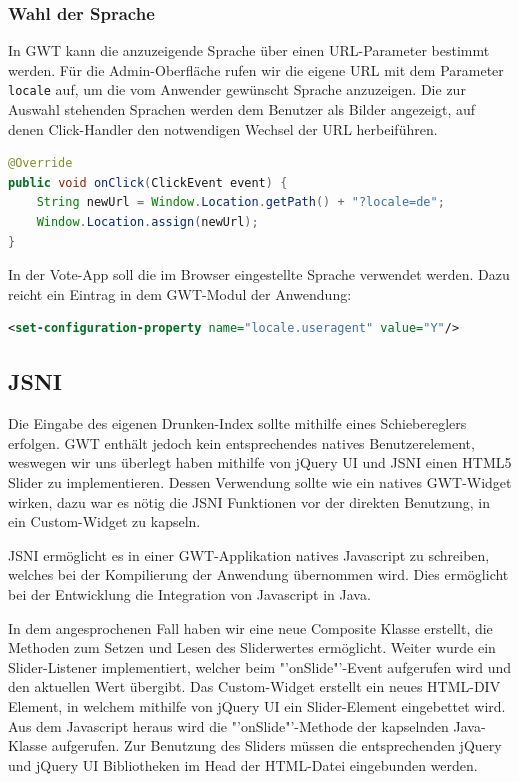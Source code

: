 \subsubsection{Wahl der Sprache}
In GWT kann die anzuzeigende Sprache über einen URL-Parameter bestimmt werden. Für die Admin-Oberfläche rufen wir die eigene URL
mit dem Parameter \texttt{locale} auf, um die vom Anwender
gewünscht Sprache anzuzeigen. Die zur Auswahl stehenden Sprachen werden dem Benutzer als Bilder angezeigt, auf denen Click-Handler den notwendigen Wechsel der URL herbeiführen.
\begin{lstlisting}[language=Java]
@Override
public void onClick(ClickEvent event) {
	String newUrl = Window.Location.getPath() + "?locale=de";
	Window.Location.assign(newUrl);
}
\end{lstlisting}
In der Vote-App soll die im Browser eingestellte Sprache verwendet werden. Dazu reicht ein Eintrag in dem GWT-Modul
der Anwendung:
\begin{lstlisting}[language=XML]
<set-configuration-property name="locale.useragent" value="Y"/>
\end{lstlisting}

\subsection{JSNI}
Die Eingabe des eigenen Drunken-Index sollte mithilfe eines Schiebereglers erfolgen. GWT enthält jedoch kein entsprechendes natives Benutzerelement, weswegen wir uns überlegt haben mithilfe von jQuery UI und JSNI einen HTML5 Slider zu implementieren. Dessen Verwendung sollte wie ein natives GWT-Widget wirken, dazu war es nötig die JSNI Funktionen vor der direkten Benutzung, in ein Custom-Widget zu kapseln. 

JSNI ermöglicht es in einer GWT-Applikation natives Javascript zu schreiben, welches bei der Kompilierung der Anwendung übernommen wird. Dies ermöglicht bei der Entwicklung die Integration von Javascript in Java.

In dem angesprochenen Fall haben wir eine neue Composite Klasse erstellt, die Methoden zum Setzen und Lesen des Sliderwertes ermöglicht. Weiter wurde ein Slider-Listener implementiert, welcher beim "'onSlide"'-Event aufgerufen wird und den aktuellen Wert übergibt. Das Custom-Widget erstellt ein neues HTML-DIV Element, in welchem mithilfe von jQuery UI ein Slider-Element eingebettet wird. Aus dem Javascript heraus wird die "'onSlide"'-Methode der kapselnden Java-Klasse aufgerufen. Zur Benutzung des Sliders müssen die entsprechenden jQuery und jQuery UI Bibliotheken im Head der HTML-Datei eingebunden werden.

